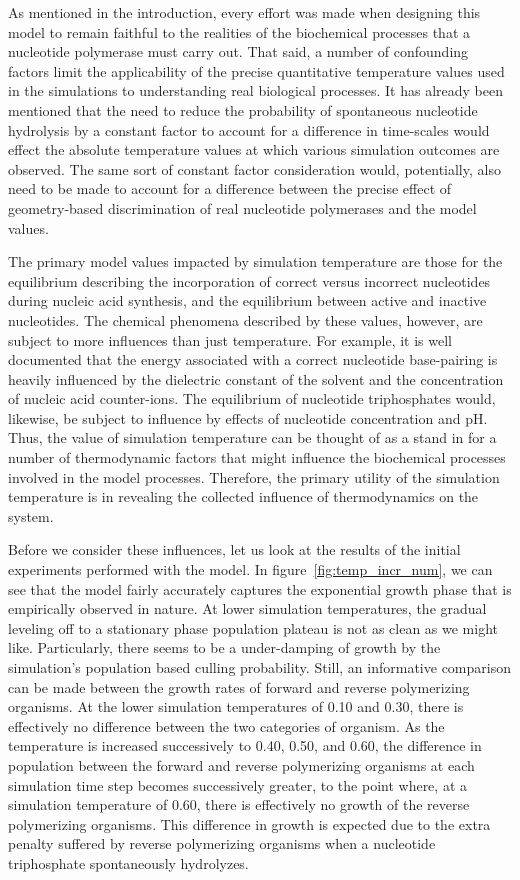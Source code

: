 As mentioned in the introduction, every effort was made when designing this model to remain faithful to the realities of the biochemical processes that a nucleotide polymerase must carry out. That said, a number of confounding factors limit the applicability of the precise quantitative temperature values used in the simulations to understanding real biological processes. It has already been mentioned that the need to reduce the probability of spontaneous nucleotide hydrolysis by a constant factor to account for a difference in time-scales would effect the absolute temperature values at which various simulation outcomes are observed. The same sort of constant factor consideration would, potentially, also need to be made to account for a difference between the precise effect of geometry-based discrimination of real nucleotide polymerases and the model values.

The primary model values impacted by simulation temperature are those for the equilibrium describing the incorporation of correct versus incorrect nucleotides during nucleic acid synthesis, and the equilibrium between active and inactive nucleotides. The chemical phenomena described by these values, however, are subject to more influences than just temperature. For example, it is well documented that the energy associated with a correct nucleotide base-pairing is heavily influenced by the dielectric constant of the solvent and the concentration of nucleic acid counter-ions. The equilibrium of nucleotide triphosphates would, likewise, be subject to influence by effects of nucleotide concentration and pH. Thus, the value of simulation temperature can be thought of as a stand in for a number of thermodynamic factors that might influence the biochemical processes involved in the model processes. Therefore, the primary utility of the simulation temperature is in revealing the collected influence of thermodynamics on the system.

Before we consider these influences, let us look at the results of the initial experiments performed with the model. In figure~\ref{fig:temp_incr_num}, we can see that the model fairly accurately captures the exponential growth phase that is empirically observed in nature. At lower simulation temperatures, the gradual leveling off to a stationary phase population plateau is not as clean as we might like. Particularly, there seems to be a under-damping of growth by the simulation's population based culling probability. Still, an informative comparison can be made between the growth rates of forward and reverse polymerizing organisms. At the lower simulation temperatures of 0.10 and 0.30, there is effectively no difference between the two categories of organism. As the temperature is increased successively to 0.40, 0.50, and 0.60, the difference in population between the forward and reverse polymerizing organisms at each simulation time step becomes successively greater, to the point where, at a simulation temperature of 0.60, there is effectively no growth of the reverse polymerizing organisms. This difference in growth is expected due to the extra penalty suffered by reverse polymerizing organisms when a nucleotide triphosphate spontaneously hydrolyzes.

